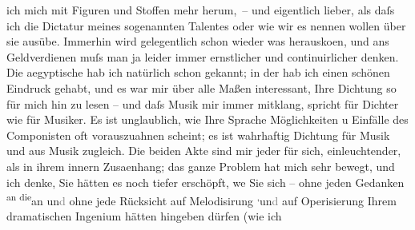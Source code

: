 \begin{ledgroupsized}[t]{13cm}
               ich mich mit Figuren und Stoffen mehr herum, – und eigentlich lieber, als daſs ich
               die Dictatur meines sogenannten Talentes oder wie wir es nennen wollen über sie
               ausübe. Immerhin wird gelegentlich schon wieder was herausko{\geminationm}en, und ans Geldverdienen muſs man ja leider immer
               ernstlicher und continuirlicher denken.\pend
           \pstart
           Die aegyptische hab ich natürlich
               schon gekannt; in der \label{K_L02504_1v}\label{K_L02504_1h} hab ich
               einen schönen Eindruck gehabt, und es war mir über alle Maßen interessant, Ihre
               Dichtung so für mich hin zu lesen – und daſs Musik mir immer mitklang, spricht für
               Dichter wie für Musiker. Es ist unglaublich, wie Ihre Sprache Möglichkeiten u
               Einfälle des Componisten oft vorauszuahnen scheint; es ist wahrhaftig Dichtung für
               Musik und aus Musik zugleich. Die beiden Akte sind mir {\pb}jeder für sich, einleuchtender, als in ihrem innern Zusa{\geminationm}enhang; das ganze Problem hat mich sehr bewegt, und ich
               denke, Sie hätten es noch tiefer erschöpft, we{\geminationn} Sie sich
               – ohne jeden Gedanken \substVorne{}\textsuperscript{an die}{\allowbreak}\substDazwischen{}an\substHinten{} un\textcolor{gray}{d} ohne jede Rücksicht auf Melodisirung \substVorne{}\textsuperscript{,}\substDazwischen{}un\textcolor{gray}{d}\substHinten{} auf Operisierung Ihrem dramatischen Ingenium hätten hingeben dürfen (wie ich

\end{ledgroupsized}
